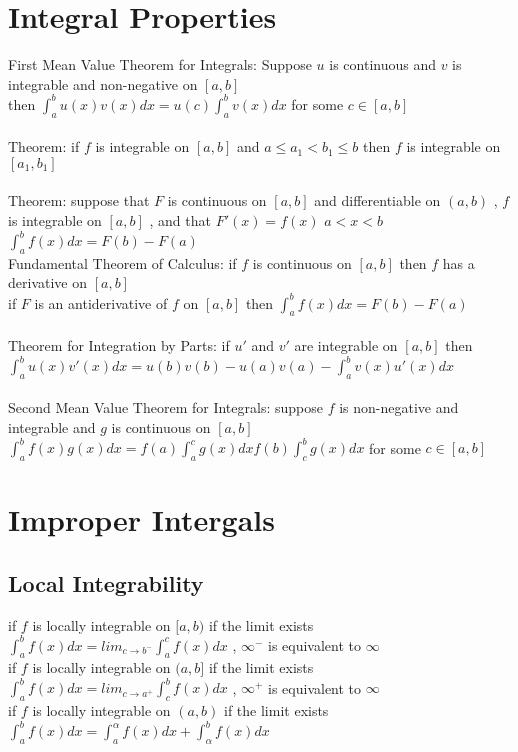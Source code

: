 \documentclass[12pt]{article}
\begin{document}
\section{Integral Properties}
First Mean Value Theorem for Integrals: Suppose $u$ is continuous and $v$ is integrable and non-negative on $[a,b]$ \\
then $\int_{a}^{b}u(x)v(x)dx = u(c) \int_{a}^{b}v(x)dx$ for some $c \in [a,b]$ \\
\\
Theorem: if $f$ is integrable on $[a,b]$ and $a \le a_{1} < b_{1} \le b$ then $f$ is integrable on $[a_{1},b_{1}]$ \\
\\
Theorem: suppose that $F$ is continuous on $[a,b]$ and differentiable on $(a,b)$ , $f$ is integrable on $[a,b]$ , and that $F'(x) = f(x)$  $a<x<b$ \\
$\int_{a}^{b}f(x)dx = F(b) - F(a)$ \\
Fundamental Theorem of Calculus: if $f$ is continuous on $[a,b]$ then $f$ has a derivative on $[a,b]$ \\
if $F$ is an antiderivative of $f$ on $[a,b]$ then $\int_{a}^{b}f(x)dx = F(b) - F(a)$ \\
\\
Theorem for Integration by Parts: if $u'$ and $v'$ are integrable on $[a,b]$ then $\int_{a}^{b}u(x)v'(x)dx = u(b)v(b) - u(a)v(a) - \int_{a}^{b}v(x)u'(x)dx$ \\
\\
Second Mean Value Theorem for Integrals: suppose $f$ is non-negative and integrable and $g$ is continuous on $[a,b]$ \\
$\int_{a}^{b}f(x)g(x)dx = f(a) \int_{a}^{c}g(x)dx f(b) \int_{c}^{b}g(x)dx$ for some $c \in [a,b]$ \\

\section{Improper Intergals}
\subsection{Local Integrability}
if $f$ is locally integrable on $[a,b)$ if the limit exists $\int_{a}^{b}f(x)dx = lim_{c \to b^{-}} \int_{a}^{c}f(x)dx$ , $\infty^{-}$ is equivalent to $\infty$ \\
if $f$ is locally integrable on $(a,b]$ if the limit exists $\int_{a}^{b}f(x)dx = lim_{c \to a^{+}} \int_{c}^{b}f(x)dx$ , $\infty^{+}$ is equivalent to $\infty$ \\
if $f$ is locally integrable on $(a,b)$ if the limit exists $\int_{a}^{b}f(x)dx = \int_{a}^{\alpha}f(x)dx + \int_{\alpha}^{b}f(x)dx$
\end{document}
